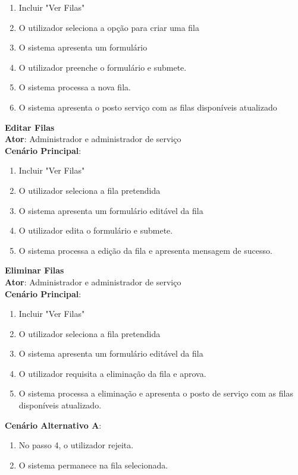 \begin{enumerate}[nolistsep]
	\item Incluir "Ver Filas"
	\item O utilizador seleciona a opção para criar uma fila
	\item O sistema apresenta um formulário 
	\item O utilizador preenche o formulário e submete.
	\item O sistema processa a nova fila.
	\item O sistema apresenta o posto serviço com as filas disponíveis atualizado
\end{enumerate}

{\large\textbf{Editar Filas}} \\
\textbf{Ator}: Administrador e administrador de serviço \\
\textbf{Cenário Principal}:

\begin{enumerate}[nolistsep]
	\item Incluir "Ver Filas"
	\item O utilizador seleciona a fila pretendida
	\item O sistema apresenta um formulário editável da fila
	\item O utilizador edita o formulário e submete.
	\item O sistema processa a edição da fila e apresenta mensagem de sucesso.
\end{enumerate}

{\large\textbf{Eliminar Filas}} \\
\textbf{Ator}: Administrador e administrador de serviço \\
\textbf{Cenário Principal}:

\begin{enumerate}[nolistsep]
	\item Incluir "Ver Filas"
	\item O utilizador seleciona a fila pretendida
	\item O sistema apresenta um formulário editável da fila
	\item O utilizador requisita a eliminação da fila e aprova.
	\item O sistema processa a eliminação e apresenta o posto de serviço com as filas disponíveis atualizado.
\end{enumerate}

\textbf{Cenário Alternativo A}:

\begin{enumerate}[nolistsep]
	\item No passo 4, o utilizador rejeita.
	\item O sistema permanece na fila selecionada.
\end{enumerate}


